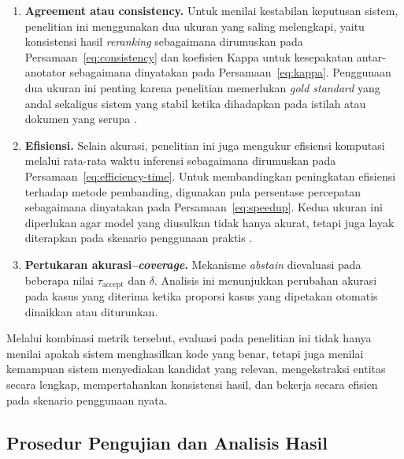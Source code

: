 \begin{enumerate}
    \item \textbf{Agreement atau consistency.} Untuk menilai kestabilan keputusan sistem, penelitian ini menggunakan dua ukuran yang saling melengkapi, yaitu konsistensi hasil \textit{reranking} sebagaimana dirumuskan pada Persamaan~\ref{eq:consistency} dan koefisien Kappa untuk kesepakatan antar-anotator sebagaimana dinyatakan pada Persamaan~\ref{eq:kappa}. Penggunaan dua ukuran ini penting karena penelitian memerlukan \textit{gold standard} yang andal sekaligus sistem yang stabil ketika dihadapkan pada istilah atau dokumen yang serupa \citep{januel_improved_2011,gilani_cde-mapper_2025}.

    \item \textbf{Efisiensi.} Selain akurasi, penelitian ini juga mengukur efisiensi komputasi melalui rata-rata waktu inferensi sebagaimana dirumuskan pada Persamaan~\ref{eq:efficiency-time}. Untuk membandingkan peningkatan efisiensi terhadap metode pembanding, digunakan pula persentase percepatan sebagaimana dinyatakan pada Persamaan~\ref{eq:speedup}. Kedua ukuran ini diperlukan agar model yang diusulkan tidak hanya akurat, tetapi juga layak diterapkan pada skenario penggunaan praktis \citep{gilani_cde-mapper_2025,park_development_2026}.

    \item \textbf{Pertukaran akurasi--\textit{coverage}.} Mekanisme \textit{abstain} dievaluasi pada beberapa nilai $\tau_{\mathrm{accept}}$ dan $\delta$. Analisis ini menunjukkan perubahan akurasi pada kasus yang diterima ketika proporsi kasus yang dipetakan otomatis dinaikkan atau diturunkan.
\end{enumerate}

Melalui kombinasi metrik tersebut, evaluasi pada penelitian ini tidak hanya menilai apakah sistem menghasilkan kode yang benar, tetapi juga menilai kemampuan sistem menyediakan kandidat yang relevan, mengekstraksi entitas secara lengkap, mempertahankan konsistensi hasil, dan bekerja secara efisien pada skenario penggunaan nyata.

\subsection{Prosedur Pengujian dan Analisis Hasil}

